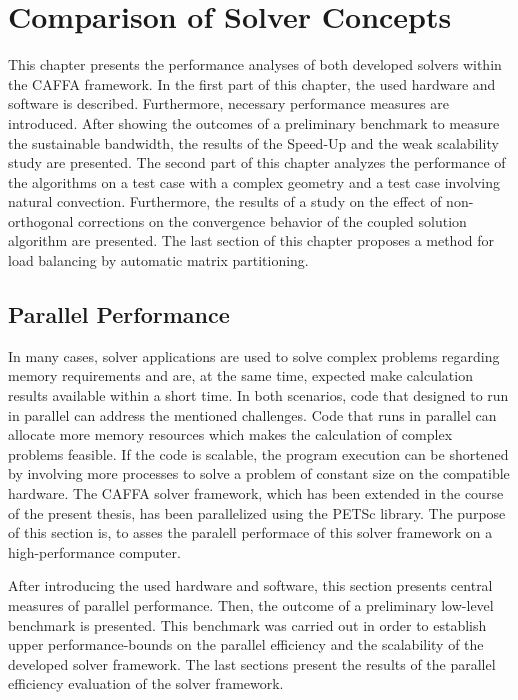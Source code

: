\chapter{Comparison of Solver Concepts}
\label{sec:compare}

This chapter presents the performance analyses of both developed solvers within the CAFFA framework. In the first part of this chapter, the used hardware and software is described. Furthermore, necessary performance measures are introduced. After showing the outcomes of a preliminary benchmark to measure the sustainable bandwidth, the results of the Speed-Up and the weak scalability study are presented. The second part of this chapter analyzes the performance of the algorithms on a test case with a complex geometry and a test case involving natural convection. Furthermore, the results of a study on the effect of non-orthogonal corrections on the convergence behavior of the coupled solution algorithm are presented. The last section of this chapter proposes a method for load balancing by automatic matrix partitioning.
  
\section{Parallel Performance}

In many cases, solver applications are used to solve complex problems regarding memory requirements and are, at the same time, expected make calculation results available within a short time. In both scenarios, code that designed to run in parallel can address the mentioned challenges. Code that runs in parallel can allocate more memory resources which makes the calculation of complex problems feasible. If the code is scalable, the program execution can be shortened by involving more processes to solve a problem of constant size on the compatible hardware. The CAFFA solver framework, which has been extended in the course of the present thesis, has been parallelized using the PETSc library. The purpose of this section is, to asses the paralell performace of this solver framework on a high-performance computer.

After introducing the used hardware and software, this section presents central measures of parallel performance. Then, the outcome of a preliminary low-level benchmark is presented. This benchmark was carried out in order to establish upper performance-bounds on the parallel efficiency and the scalability of the developed solver framework. The last sections present the results of the parallel efficiency evaluation of the solver framework.

